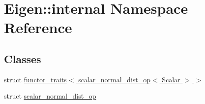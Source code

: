 \hypertarget{namespaceEigen_1_1internal}{}\section{Eigen\+:\+:internal Namespace Reference}
\label{namespaceEigen_1_1internal}
\subsection*{Classes}
\begin{DoxyCompactItemize}
\item 
struct \hyperlink{structEigen_1_1internal_1_1functor__traits_3_01scalar__normal__dist__op_3_01Scalar_01_4_01_4}{functor\+\_\+traits$<$ scalar\+\_\+normal\+\_\+dist\+\_\+op$<$ Scalar $>$ $>$}
\item 
struct \hyperlink{structEigen_1_1internal_1_1scalar__normal__dist__op}{scalar\+\_\+normal\+\_\+dist\+\_\+op}
\end{DoxyCompactItemize}
